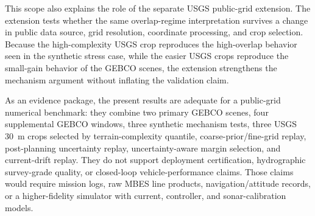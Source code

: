 \documentclass[jmse,article,submit,moreauthors]{Definitions/mdpi}
\begin{document}
This scope also explains the role of the separate USGS public-grid extension. The extension tests whether the same overlap-regime interpretation survives a change in public data source, grid resolution, coordinate processing, and crop selection. Because the high-complexity USGS crop reproduces the high-overlap behavior seen in the synthetic stress case, while the easier USGS crops reproduce the small-gain behavior of the GEBCO scenes, the extension strengthens the mechanism argument without inflating the validation claim.

As an evidence package, the present results are adequate for a public-grid numerical benchmark: they combine two primary GEBCO scenes, four supplemental GEBCO windows, three synthetic mechanism tests, three USGS 30~m crops selected by terrain-complexity quantile, coarse-prior/fine-grid replay, post-planning uncertainty replay, uncertainty-aware margin selection, and current-drift replay. They do not support deployment certification, hydrographic survey-grade quality, or closed-loop vehicle-performance claims. Those claims would require mission logs, raw MBES line products, navigation/attitude records, or a higher-fidelity simulator with current, controller, and sonar-calibration models.
\end{document}
